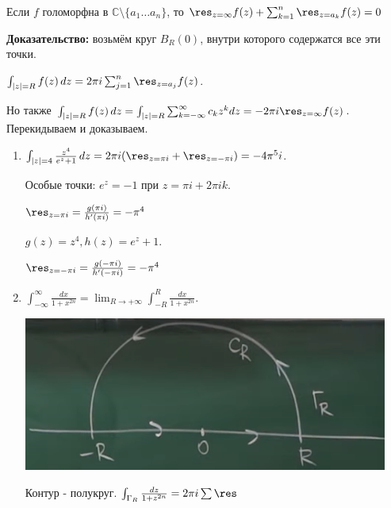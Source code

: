 \begin{consequence}
    Если $f$ голоморфна в $\mathbb{C} \setminus \{ a_1 \ldots a_n \} $, то
    $\res_{z = \infty} f(z) + \sum_{k = 1}^n \res_{z = a_k} f(z) = 0$

    \textbf{Доказательство:} возьмём круг $B_R (0)$, внутри которого содержатся все эти точки.

    $\int_{|z| = R} f(z) \, dz = 2 \pi i \sum_{j = 1}^n \res_{z = a_j} f(z)$.

    Но также $\int_{|z| = R} f(z) \, dz = \int_{|z| = R}{ \sum_{k = -\infty}^{\infty} c_k z^k dz } = -2 \pi i \res_{z = \infty} f(z)$. Перекидываем и доказываем.
\end{consequence}

\begin{example}
    \begin{enumerate}
        \item {
            $\int_{|z| = 4} \frac{z^4}{e^z + 1} \, dz = 2 \pi i (\res_{z = \pi i} + \res_{z = -\pi i}) = -4\pi^5 i$.
            
            Особые точки: $e^z = -1$ при $z = \pi i + 2 \pi i k$. 

            $\res_{z = \pi i} = \frac{g(\pi i)}{h'(\pi i)} = -\pi^4$

            $g(z) = z^4, h(z) = e^z + 1$.

            $\res_{z = -\pi i} = \frac{g(-\pi i)}{h'(-\pi i)} = -\pi^4$
        }
        \item {     
            $\int_{-\infty}^{\infty} \frac{dx}{1 + x^{2n}} = \lim_{R \to +\infty} \int_{-R}^{R} \frac{dx}{1 + x^{2n}}$.
            
            \begin{center}
                \includegraphics[width=12cm]{assets/04-functions-of-complex-variables/example-2-cauchy-about-deductions.png}
            \end{center}

            Контур - полукруг. $\int_{\Gamma_R} \frac{dz}{1 + z^{2n}} = 2 \pi i \sum \res$

}
\end{enumerate}
\end{example}
